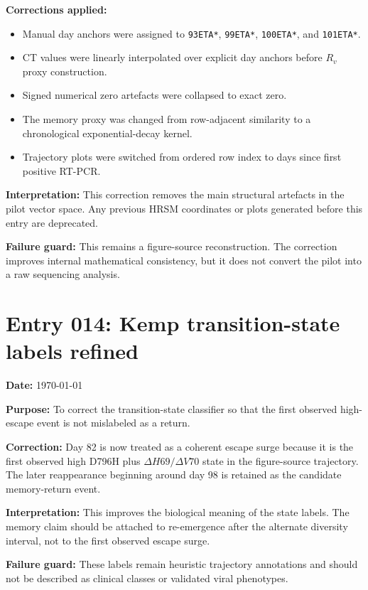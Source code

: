 \textbf{Corrections applied:}
\begin{itemize}
    \item Manual day anchors were assigned to \texttt{93ETA*}, \texttt{99ETA*}, \texttt{100ETA*}, and \texttt{101ETA*}.
    \item CT values were linearly interpolated over explicit day anchors before \(R_v\) proxy construction.
    \item Signed numerical zero artefacts were collapsed to exact zero.
    \item The memory proxy was changed from row-adjacent similarity to a chronological exponential-decay kernel.
    \item Trajectory plots were switched from ordered row index to days since first positive RT-PCR.
\end{itemize}

\textbf{Interpretation:} This correction removes the main structural artefacts in the pilot vector space. Any previous HRSM coordinates or plots generated before this entry are deprecated.

\textbf{Failure guard:} This remains a figure-source reconstruction. The correction improves internal mathematical consistency, but it does not convert the pilot into a raw sequencing analysis.


\section*{Entry 014: Kemp transition-state labels refined}

\textbf{Date:} \today

\textbf{Purpose:} To correct the transition-state classifier so that the first observed high-escape event is not mislabeled as a return.

\textbf{Correction:} Day 82 is now treated as a coherent escape surge because it is the first observed high D796H plus \(\Delta H69/\Delta V70\) state in the figure-source trajectory. The later reappearance beginning around day 98 is retained as the candidate memory-return event.

\textbf{Interpretation:} This improves the biological meaning of the state labels. The memory claim should be attached to re-emergence after the alternate diversity interval, not to the first observed escape surge.

\textbf{Failure guard:} These labels remain heuristic trajectory annotations and should not be described as clinical classes or validated viral phenotypes.


